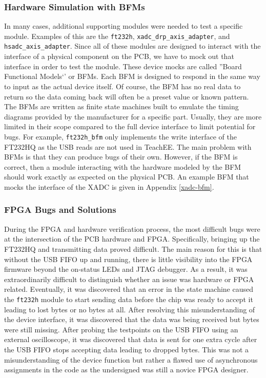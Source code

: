 \documentclass[letterpaper,11pt]{article}
\newcommand{\code}[1]{\texttt{#1}}
\begin{document}
\subsubsection{Hardware Simulation with BFMs}
In many cases, additional supporting modules were needed to test a specific
module. Examples of this are the \code{ft232h}, \code{xadc_drp_axis_adapter},
and \code{hsadc_axis_adapter}. Since all of these modules are designed to
interact with the interface of a physical component on the PCB, we have to mock
out that interface in order to test the module. These device mocks are called
''Board Functional Models`' or BFMs. Each BFM is designed to respond in the same
way to input as the actual device itself. Of course, the BFM has no real data to
return so the data coming back will often be a preset value or known pattern.
The BFMs are written as finite state machines built to emulate the timing
diagrams provided by the manufacturer for a specific part. Usually, they are
more limited in their scope compared to the full device interface to limit
potential for bugs. For example, \code{ft232h_bfm} only implements the write
interface of the FT232HQ as the USB reads are not used in TeachEE. The main
problem with BFMs is that they can produce bugs of their own. However, if the
BFM is correct, then a module interacting with the hardware modeled by the BFM
should work exactly as expected on the physical PCB. An example BFM that mocks
the interface of the XADC is given in Appendix \ref{xadc-bfm}.

\subsubsection{FPGA Bugs and Solutions} \label{sec:fpga-bugs}
During the FPGA and hardware verification process, the most difficult bugs were
at the intersection of the PCB hardware and FPGA. Specifically, bringing up the
FT232HQ and transmitting data proved difficult. The main reason for this is
that without the USB FIFO up and running, there is little visibility into the
FPGA firmware beyond the on-status LEDs and JTAG debugger. As a result, it was
extraordinarily difficult to distinguish whether an issue was hardware or FPGA
related. Eventually, it was discovered that an error in the state machine caused
the \code{ft232h} module to start sending data before the chip was ready to
accept it leading to lost bytes or no bytes at all. After resolving this
misunderstanding of the device interface, it was discovered that the data was
being received but bytes were still missing. After probing the testpoints on the
USB FIFO using an external oscilloscope, it was discovered that data is sent for
one extra cycle after the USB FIFO stops accepting data leading to dropped
bytes. This was not a misunderstanding of the device function but rather a
flawed use of asynchronous assignments in the code as the undersigned was still
a novice FPGA designer.
\end{document}
